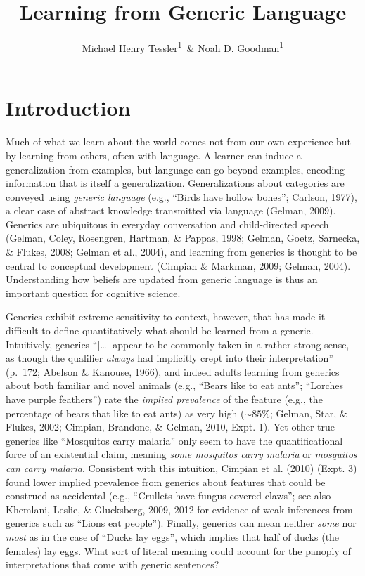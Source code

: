\documentclass[floatsintext,doc]{apa6}
\title{Learning from Generic Language}
\author{Michael Henry Tessler\textsuperscript{1}~\& Noah D. Goodman\textsuperscript{1}}
\date{}
\affiliation{
\vspace{0.5cm}
\textsuperscript{1} Department of Psychology, Stanford University}
\begin{document}
\maketitle



\hypertarget{introduction}{%
\section{Introduction}\label{introduction}}

Much of what we learn about the world comes not from our own experience but by learning from others, often with language.
A learner can induce a generalization from examples, but language can go beyond examples, encoding information that is itself a generalization.
Generalizations about categories are conveyed using \emph{generic language} (e.g., ``Birds have hollow bones''; Carlson, 1977), a clear case of abstract knowledge transmitted via language (Gelman, 2009).
Generics are ubiquitous in everyday conversation and child-directed speech (Gelman, Coley, Rosengren, Hartman, \& Pappas, 1998; Gelman, Goetz, Sarnecka, \& Flukes, 2008; Gelman et al., 2004), and learning from generics is thought to be central to conceptual development (Cimpian \& Markman, 2009; Gelman, 2004).
Understanding how beliefs are updated from generic language is thus an important question for cognitive science.

Generics exhibit extreme sensitivity to context, however, that has made it difficult to define quantitatively what should be learned from a generic.
Intuitively, generics \enquote{{[}\ldots{}{]} appear to be commonly taken in a rather strong sense, as though the qualifier \emph{always} had implicitly crept into their interpretation} (p.~172; Abelson \& Kanouse, 1966), and indeed adults learning from generics about both familiar and novel animals (e.g., \enquote{Bears like to eat ants}; \enquote{Lorches have purple feathers}) rate the \emph{implied prevalence} of the feature (e.g., the percentage of bears that like to eat ants) as very high (\(\sim 85\%\); Gelman, Star, \& Flukes, 2002; Cimpian, Brandone, \& Gelman, 2010, Expt. 1).
Yet other true generics like \enquote{Mosquitos carry malaria} only seem to have the quantificational force of an existential claim, meaning \emph{some mosquitos carry malaria} or \emph{mosquitos can carry malaria}.
Consistent with this intuition, Cimpian et al. (2010) (Expt. 3) found lower implied prevalence from generics about features that could be construed as accidental (e.g., ``Crullets have fungus-covered claws''; see also Khemlani, Leslie, \& Glucksberg, 2009, 2012 for evidence of weak inferences from generics such as ``Lions eat people'').
Finally, generics can mean neither \emph{some} nor \emph{most} as in the case of \enquote{Ducks lay eggs}, which implies that half of ducks (the females) lay eggs.
What sort of literal meaning could account for the panoply of interpretations that come with generic sentences?
\end{document}
